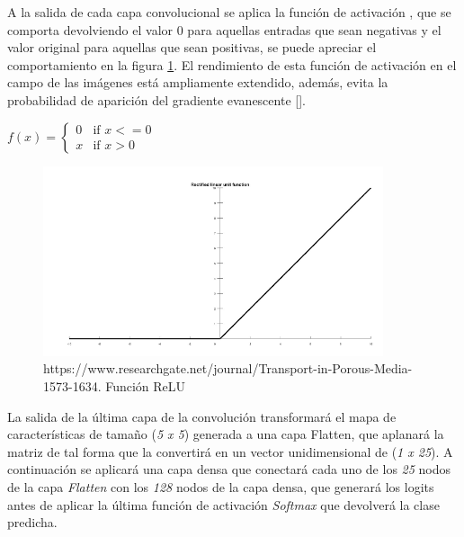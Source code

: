 \begin{enumerate}
                A la salida de cada capa convolucional se aplica la función de activación , que se comporta devolviendo el valor $0$ para aquellas entradas que sean negativas y el valor original para aquellas que sean positivas, se puede apreciar el comportamiento en la figura \ref{RELUImage}. El rendimiento de esta función de activación en el campo de las imágenes está ampliamente extendido, además, evita la probabilidad de aparición del gradiente evanescente [\cite{GradientVanishingRelu}].

                \begin{center}
                    $f(x) = \left\{
                                   \begin{array}{lr}
                                     0 & \text{if } x<=0\\
                                     x & \text{if } x>0
                                   \end{array}
                            \right.$
                \end{center}

                \begin{figure}[h]
                    \centering
                    \includegraphics[width=10cm]{archivos/4.Metodologia/Modelos/CNN/RELUImage}
                    \caption{https://www.researchgate.net/journal/Transport-in-Porous-Media-1573-1634. Función ReLU}
                    \label{RELUImage}
                 \end{figure}

                La salida de la última capa de la convolución transformará el mapa de características de tamaño (\textit{5 x 5}) generada a una capa Flatten, que aplanará la matriz de tal forma que la convertirá en un vector unidimensional de (\textit{1 x 25}). A continuación se aplicará una capa densa que conectará cada uno de los \textit{25} nodos de la capa \textit{Flatten} con los \textit{128} nodos de la capa densa, que generará los logits antes de aplicar la última función de activación \textit{Softmax} que devolverá la clase predicha.



\end{enumerate}

